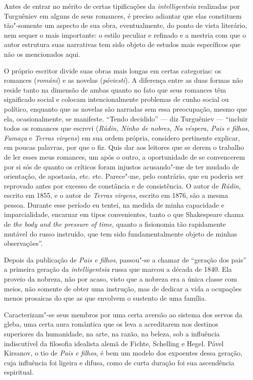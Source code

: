 Antes de entrar no mérito de certas tipificações da \emph{intelligentsia}
realizadas por Turguêniev em alguns de seus romances, é preciso adiantar
que elas constituem tão"-somente um aspecto de sua obra, eventualmente,
do ponto de vista literário, nem sequer o mais importante: o estilo
peculiar e refinado e a mestria com que o autor estrutura suas
narrativas tem sido objeto de estudos mais específicos que não os
mencionados aqui.

O próprio escritor divide suas obras mais longas em certas categorias:
os romances (\emph{románi}) e as novelas (\emph{póviesti}). A diferença entre
as duas formas não reside tanto na dimensão de ambas quanto no fato que
seus romances têm significado social e colocam intencionalmente
problemas de cunho social ou político, enquanto que as novelas são
narradas sem essa preocupação, mesmo que ela, ocasionalmente, se
manifeste. ``Tendo decidido'' --- diz Turguêniev --- ``incluir todos os
romances que escrevi (\emph{Rúdin, Ninho de nobres, Na véspera, Pais e
filhos, Fumaça} e \emph{Terras virgens}) em sua ordem própria, considero
pertinente explicar, em poucas palavras, por que o fiz. Quis dar aos
leitores que se derem o trabalho de ler esses meus romances, um após o
outro, a oportunidade de se convencerem por si sós de quanto os críticos
foram injustos acusando"-me de ter mudado de orientação, de apostasia,
etc. etc. Parece"-me, pelo contrário, que eu poderia ser reprovado antes
por excesso de constância e de consistência. O autor de \emph{Rúdin},
escrito em 1855, e o autor de \emph{Terras virgens}, escrito em 1876,
são a mesma pessoa. Durante esse período eu tentei, na medida de minha
capacidade e imparcialidade, encarnar em tipos convenientes, tanto
o que Shakespeare chama de \emph{the body and the pressure of time},
quanto a fisionomia tão rapidamente mutável do russo instruído, que tem
sido fundamentalmente objeto de minhas observações''.

Depois da publicação de \emph{Pais e filhos}, passou"-se a chamar de
``geração dos pais'' a primeira geração da \emph{intelligentsia} russa
que marcou a década de 1840. Ela proveio da nobreza, não por acaso,
visto que a nobreza era a única classe com meios, não somente de obter
uma instrução, mas de dedicar a vida a ocupações menos prosaicas do que
as que envolvem o sustento de uma família.

Caracterizam"-se seus membros por uma certa aversão ao sistema dos servos
da gleba, uma certa aura romântica que os leva a acreditarem nos
destinos superiores da humanidade, na arte, na razão, na beleza, sob a
influência indiscutível da filosofia idealista alemã de Fichte,
Schelling e Hegel. Pável Kirsanov, o tio de \emph{Pais e filhos}, é bem
um modelo dos expoentes dessa geração, cuja influência foi ligeira e
difusa, como de curta duração foi sua ascendência espiritual.

